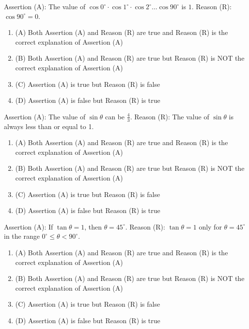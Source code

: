 \documentclass[12pt,a4paper]{exam}
\begin{document}
\begin{questions}
\question[1] Assertion (A): The value of $\cos 0^\circ \cdot \cos 1^\circ \cdot \cos 2^\circ \dots \cos 90^\circ$ is $1$. 
Reason (R): $\cos 90^\circ = 0$.
\begin{enumerate}[label=(\Alph*)]
  \item (A) Both Assertion (A) and Reason (R) are true and Reason (R) is the correct explanation of Assertion (A)
  \item (B) Both Assertion (A) and Reason (R) are true but Reason (R) is NOT the correct explanation of Assertion (A)
  \item (C) Assertion (A) is true but Reason (R) is false
  \item (D) Assertion (A) is false but Reason (R) is true
\end{enumerate}
\vspace{0.15cm}

\question[1] Assertion (A): The value of $\sin \theta$ can be $\frac{4}{3}$. Reason (R): The value of $\sin \theta$ is always less than or equal to 1.
\begin{enumerate}[label=(\Alph*)]
  \item (A) Both Assertion (A) and Reason (R) are true and Reason (R) is the correct explanation of Assertion (A)
  \item (B) Both Assertion (A) and Reason (R) are true but Reason (R) is NOT the correct explanation of Assertion (A)
  \item (C) Assertion (A) is true but Reason (R) is false
  \item (D) Assertion (A) is false but Reason (R) is true
\end{enumerate}
\vspace{0.15cm}

\question[1] Assertion (A): If $\tan \theta = 1$, then $\theta = 45^\circ$. Reason (R): $\tan \theta = 1$ only for $\theta = 45^\circ$ in the range $0^\circ \leq \theta < 90^\circ$.
\begin{enumerate}[label=(\Alph*)]
  \item (A) Both Assertion (A) and Reason (R) are true and Reason (R) is the correct explanation of Assertion (A)
  \item (B) Both Assertion (A) and Reason (R) are true but Reason (R) is NOT the correct explanation of Assertion (A)
  \item (C) Assertion (A) is true but Reason (R) is false
  \item (D) Assertion (A) is false but Reason (R) is true
\end{enumerate}
\vspace{0.15cm}


\end{questions}
\end{document}

